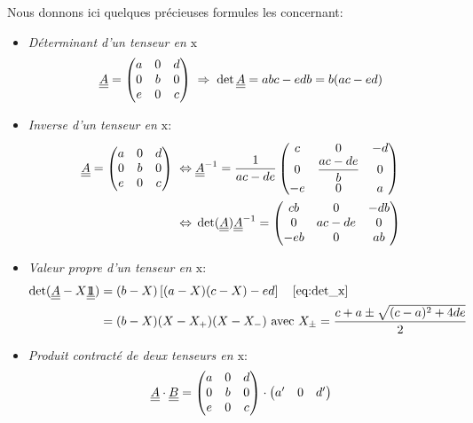 \documentclass[10pt]{book}
\begin{document}
Nous donnons ici quelques précieuses formules les concernant:
\begin{itemize}
\item \emph{Déterminant d'un tenseur en $\mathrm{x}$}
\begin{equation}
\underline{\underline{A}}=\begin{pmatrix}
a & 0 & d\\
0 & b & 0\\
e & 0 & c
\end{pmatrix} \; \Rightarrow \; \det\underline{\underline{A}}=abc-edb = b(ac-ed)
\label{eq:det_x}
\end{equation}
\item \emph{Inverse d'un tenseur en $\mathrm{x}$}:
\begin{align}\nonumber 
\underline{\underline{A}}=\begin{pmatrix}
a & 0 & d\\
0 & b & 0\\
e & 0 & c
\end{pmatrix} \; \Leftrightarrow \; &\underline{\underline{A}}^{-1} = \dfrac{1}{ac-de}\begin{pmatrix}
c & 0 & -d\\
0 & \dfrac{ac-de}{b} & 0\\
-e & 0 & a
\end{pmatrix}\\\label{eq:inv_tens_x}
\; \Leftrightarrow \; &\det(\underline{\underline{A}})\underline{\underline{A}}^{-1} = \begin{pmatrix}
cb & 0 & -db\\
0 & ac-de & 0\\
-eb & 0 & ab
\end{pmatrix}
\end{align}
\item \emph{Valeur propre d'un tenseur en $\mathrm{x}$}:
$$\begin{aligned} 
\det(\underline{\underline{A}}-X\underline{\underline{1\!\!1}})&=(b-X)\left[(a-X)(c-X)-ed\right] \quad \eqref{eq:det_x}\\
&=(b-X)(X-X_{+})(X-X_{-}) \text{ avec } X_{\pm}=\dfrac{c+a\pm\sqrt{(c-a)^{2}+4de}}{2}
\end{aligned}$$
\item \emph{Produit contracté de deux tenseurs en $\mathrm{x}$}:
\begin{equation}
\underline{\underline{A}}\cdot\underline{\underline{B}}= \begin{pmatrix}
a & 0 & d\\
0 & b & 0\\
e & 0 & c
\end{pmatrix}\cdot\begin{pmatrix}
a' & 0 & d'\\

\end{pmatrix}
\end{equation}
\end{itemize}
\end{document}
